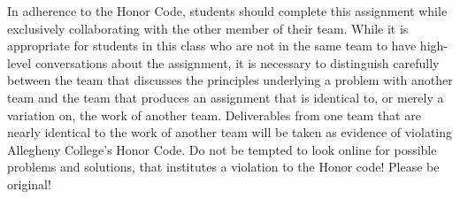 \noindent In adherence to the Honor Code, students should complete this assignment while exclusively collaborating with the other member of their team. While it is appropriate for students in this class who are not in the same team to have high-level conversations about the assignment, it is necessary to distinguish carefully between the team that discusses the principles underlying a problem with another team and the team that produces an assignment that is identical to, or merely a variation on, the work of another team. Deliverables from one team that are nearly identical to the work of another team will be taken as evidence of violating Allegheny College's Honor Code. Do not be tempted to look online for possible problems and solutions, that institutes a violation to the Honor code! Please be original!


